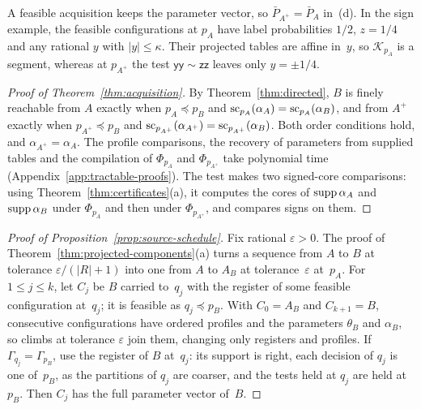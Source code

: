 A feasible acquisition keeps the parameter vector, so
$\bar P_{A^+}=\bar P_A$ in~(d). In the sign example, the feasible
configurations at $p_A$ have label probabilities $1/2$, $z=1/4$ and any
rational $y$ with $|y|\le\kappa$. Their projected tables are affine
in~$y$, so $\mathcal K_{p_A}$ is a segment, whereas at $p_{A^+}$ the test
$\mathsf{yy}\sim\mathsf{zz}$ leaves only $y=\pm1/4$.

\begin{proof}[Proof of Theorem~\ref{thm:acquisition}]
By Theorem~\ref{thm:directed}, $B$ is finely reachable from $A$ exactly
when $p_A\preceq p_B$ and $\operatorname{sc}_{p_A}(\alpha_A)=\operatorname{sc}_{p_A}(\alpha_B)$, and
from $A^+$ exactly when $p_{A^+}\preceq p_B$ and
$\operatorname{sc}_{p_{A^+}}(\alpha_{A^+})=\operatorname{sc}_{p_{A^+}}(\alpha_B)$. Both order
conditions hold, and $\alpha_{A^+}=\alpha_A$. The profile comparisons, the
recovery of parameters from supplied tables and the compilation of
$\Phi_{p_A}$ and $\Phi_{p_{A^+}}$ take polynomial time
(Appendix~\ref{app:tractable-proofs}). The test makes two signed-core
comparisons: using Theorem~\ref{thm:certificates}(a), it computes the
cores of $\operatorname{supp}\alpha_A$ and $\operatorname{supp}\alpha_B$ under $\Phi_{p_A}$ and then
under $\Phi_{p_{A^+}}$, and compares signs on them.
\end{proof}

\begin{proof}[Proof of Proposition~\ref{prop:source-schedule}]
Fix rational $\varepsilon>0$. The proof of
Theorem~\ref{thm:projected-components}(a) turns a sequence from $A$ to $B$
at tolerance $\varepsilon/(|R|+1)$ into one from $A$ to $A_B$ at
tolerance~$\varepsilon$ at~$p_A$. For $1\le j\le k$, let $C_j$ be $B$
carried to~$q_j$ with the register of some feasible configuration
at~$q_j$; it is feasible as $q_j\preceq p_B$. With $C_0=A_B$ and
$C_{k+1}=B$, consecutive configurations have ordered profiles and the
parameters $\theta_B$ and $\alpha_B$, so climbs at tolerance $\varepsilon$
join them, changing only registers and profiles. If
$\Gamma_{q_j}=\Gamma_{p_B}$, use the register of $B$ at~$q_j$: its support
is right, each decision of $q_j$ is one of~$p_B$, as the partitions of
$q_j$ are coarser, and the tests held at $q_j$ are held at~$p_B$. Then
$C_j$ has the full parameter vector of~$B$.
\end{proof}

